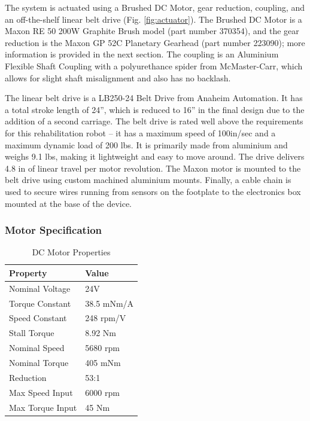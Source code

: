 \documentclass[12pt]{report}
\begin{document}
		
	The system is actuated using a Brushed DC Motor, gear reduction, coupling, and an off-the-shelf linear belt drive (Fig. \ref{fig:actuator}). The Brushed DC Motor is a Maxon RE 50 200W Graphite Brush model (part number 370354), and the gear reduction is the Maxon GP 52C Planetary Gearhead (part number 223090); more information is provided in the next section. The coupling is an Aluminium Flexible Shaft Coupling with a polyurethance spider from McMaster-Carr, which allows for slight shaft misalignment and also has no backlash. 
	
	The linear belt drive is a LB250-24 Belt Drive from Anaheim Automation. It has a total stroke length of 24'', which is reduced to 16'' in the final design due to the addition of a second carriage. The belt drive is rated well above the requirements for this rehabilitation robot -- it has a maximum speed of 100in/sec and a maximum dynamic load of 200 lbs. It is primarily made from aluminium and weighs 9.1 lbs, making it lightweight and easy to move around. The drive delivers 4.8 in of linear travel per motor revolution. The Maxon motor is mounted to the belt drive using custom machined aluminium mounts. Finally, a cable chain is used to secure wires running from sensors on the footplate to the electronics box mounted at the base of the device. 
	
	

	\subsubsection{Motor Specification}
	
	\begin{table}[h]
	\centering
	\caption{DC Motor Properties}	
	\begin{tabular}{|l|l|}
		\hline
		\textbf{Property} & \textbf{Value}  \\ \hline
 		Nominal Voltage & 24V  \\ \hline
 		Torque Constant & 38.5 mNm/A \\ \hline
 		Speed Constant & 248 rpm/V  \\ \hline
 		Stall Torque & 8.92 Nm \\ \hline
 		Nominal Speed & 5680 rpm \\ \hline
 		Nominal Torque & 405 mNm \\ \hline
 		Reduction & 53:1  \\ \hline
 		Max Speed Input & 6000 rpm  \\ \hline
 		Max Torque Input & 45 Nm  \\ \hline
		\end{tabular}
	\label{tab:motor}
	\end{table}
	
\end{document}
